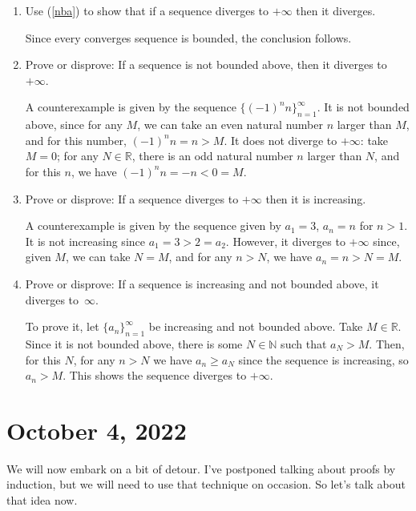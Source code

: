 \documentclass[12pt]{amsart}
\newcommand{\R}{{\mathbb{R}}}
\newcommand{\N}{\mathbb{N}}
\numberwithin{equation}{section}
\theoremstyle{plain} %
\newcommand{\Oct}[1]{\section{October #1, 2022}}
\theoremstyle{definition}
\theoremstyle{remark}
\begin{document}
\begin{enumerate}
\item Use (\ref{nba}) to show that if a sequence diverges to $+\infty$ then it diverges.

\begin{framed}  Since every converges sequence is bounded, the conclusion follows.
\end{framed}


\item Prove or disprove: If a sequence is not bounded above, then it diverges to $+\infty$.

\begin{framed}  A counterexample is given by the sequence $\{ (-1)^n n \}_{n=1}^\infty$. It is not bounded above, since for any $M$, we can take an even natural number $n$ larger than $M$, and for this number, $(-1)^n  n = n >M$. It does not diverge to $+\infty$: take $M=0$; for any $N\in \R$, there is an odd natural number $n$ larger than $N$, and for this $n$, we have $(-1)^n n = - n < 0 = M$.
\end{framed}

\item Prove or disprove:  If a sequence diverges to $+\infty$ then it is increasing.

\begin{framed}  A counterexample is given by the sequence given by $a_1 = 3$, $a_n=n$ for $n>1$. It is not increasing since $a_1=3 > 2 = a_2$. However, it diverges to $+\infty$ since, given $M$, we can take $N=M$, and for any $n>N$, we have $a_n=n>N=M$.
\end{framed}

\item Prove or disprove: If a sequence is increasing and not bounded above, it diverges to~$\infty$.

\begin{framed} 
To prove it, let $\{ a_n\}_{n=1}^\infty$ be  increasing and not bounded above. Take $M\in \R$. Since it is not bounded above, there is some $N\in \N$ such that $a_N >M$. Then, for this $N$, for any $n>N$ we have $a_n \geq a_N$ since the sequence is increasing, so $a_n > M$. This shows the sequence diverges to $+\infty$.
\end{framed}

\end{enumerate}

\Oct{4}
	
We will now embark on a bit of detour. I've postponed talking about proofs by induction, but we will need to use that technique on occasion. So let's talk
about that idea now. 
\end{document}
